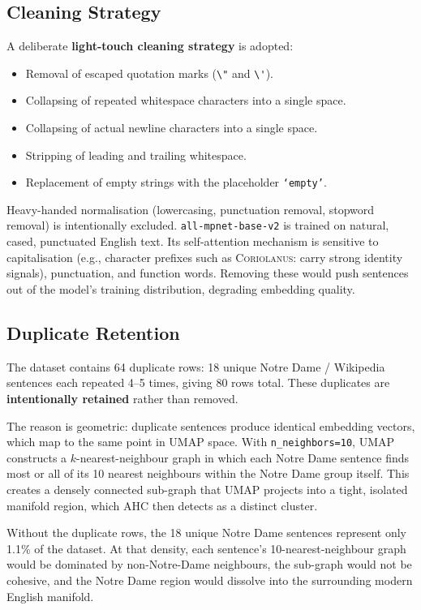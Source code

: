 \documentclass[11pt, a4paper]{article}
\begin{document}
\subsection{Cleaning Strategy}

A deliberate \textbf{light-touch cleaning strategy} is adopted:

\begin{itemize}
  \item Removal of escaped quotation marks (\verb|\"| and \verb|\'|).
  \item Collapsing of repeated whitespace characters into a single space.
  \item Collapsing of actual newline characters into a single space.
  \item Stripping of leading and trailing whitespace.
  \item Replacement of empty strings with the placeholder \texttt{`empty'}.
\end{itemize}

Heavy-handed normalisation (lowercasing, punctuation removal, stopword
removal) is intentionally excluded.  \texttt{all-mpnet-base-v2} is trained on
natural, cased, punctuated English text.  Its self-attention mechanism is
sensitive to capitalisation (e.g., character prefixes such as
\textsc{Coriolanus:} carry strong identity signals), punctuation, and function
words.  Removing these would push sentences out of the model's training
distribution, degrading embedding quality.

\subsection{Duplicate Retention}

The dataset contains 64 duplicate rows: 18 unique Notre Dame / Wikipedia
sentences each repeated 4--5 times, giving 80 rows total.  These duplicates
are \textbf{intentionally retained} rather than removed.

The reason is geometric: duplicate sentences produce identical embedding
vectors, which map to the same point in UMAP space.  With \texttt{n\_neighbors=10},
UMAP constructs a $k$-nearest-neighbour graph in which each Notre Dame
sentence finds most or all of its 10 nearest neighbours within the Notre Dame
group itself.  This creates a densely connected sub-graph that UMAP projects
into a tight, isolated manifold region, which AHC then detects as a distinct
cluster.

Without the duplicate rows, the 18 unique Notre Dame sentences represent only
1.1\% of the dataset.  At that density, each sentence's 10-nearest-neighbour
graph would be dominated by non-Notre-Dame neighbours, the sub-graph would not
be cohesive, and the Notre Dame region would dissolve into the surrounding
modern English manifold.
\end{document}
